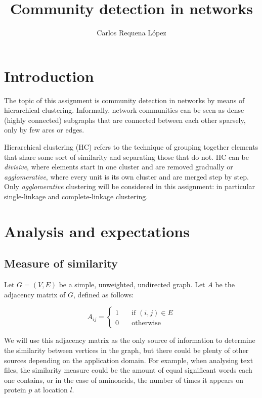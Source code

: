 \documentclass[12pt,a4paper]{article}
\title{Community detection in networks}
\author{Carlos Requena López}
\begin{document}
\thispagestyle{fancy}
\maketitle
\thispagestyle{fancy}

\section{Introduction}

The topic of this assignment is community detection in networks by
means of hierarchical clustering. Informally, network communities can
be seen as dense (highly connected) subgraphs that are connected
between each other sparsely, only by few arcs or edges.

Hierarchical clustering (HC) refers to the technique of grouping
together elements that share some sort of similarity and separating
those that do not. HC can be \emph{divisive}, where elements start in
one cluster and are removed gradually or \emph{agglomerative}, where
every unit is its own cluster and are merged step by step. Only
\emph{agglomerative} clustering will be considered in this assignment:
in particular single-linkage and complete-linkage clustering.

\section{Analysis and expectations}

\subsection{Measure of similarity}

Let $ G = (V, E) $ be a simple, unweighted, undirected graph. Let $A$
be the adjacency matrix of $G$, defined as follows:

\[
  A_{ij} =
  \begin{cases}
    1 & \quad \text{if } (i,j) \in E\\
    0 & \quad \text{otherwise }
  \end{cases}
\]

We will use this adjacency matrix as the only source of information to
determine the similarity between vertices in the graph, but there
could be plenty of other sources depending on the application
domain. For example, when analysing text files, the similarity measure
could be the amount of equal significant words each one contains, or
in the case of aminoacids, the number of times it appears on protein
$p$ at location $l$.
\end{document}
